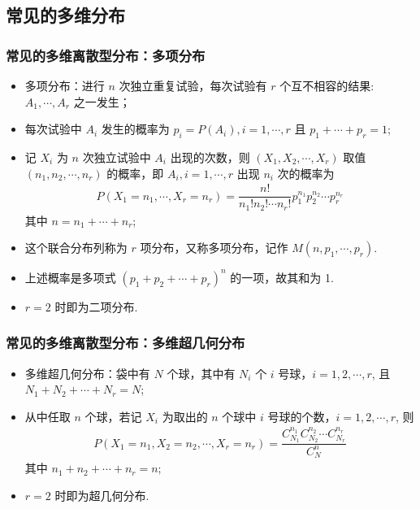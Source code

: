 \subsection{常见的多维分布}
\begin{frame}
\frametitle{常见的多维离散型分布：多项分布}
\begin{itemize}[<+-|alert@+>]
\item 多项分布：进行 $n$ 次独立重复试验，每次试验有 $r$ 个互不相容的结果:$A_1,\cdots, A_r$ 之一发生；
\item 每次试验中 $A_i$ 发生的概率为 $p_i=P (A_i), i=1,\cdots,  r$ 且 $p_1+\cdots +p_r=1$;
\item 记 $X_i$ 为 $n$ 次独立试验中 $A_i$ 出现的次数，则 $(X_1,X_2,\cdots,X_r)$ 取值 $(n_1,n_2,\cdots,n_r)$ 的概率，即 $A_i,i=1,\cdots, r$ 出现 $n_i$ 次的概率为
\pause  \begin{eqnarray*}
	P(X_1=n_1,\cdots, X_r=n_r)=\dfrac{n!}{n_1!n_2!\cdots n_r!}p_1^{n_1}p_2^{n_2}\cdots p_r^{n_r}
\end{eqnarray*}
其中 $n=n_1+\cdots+n_r$;
\item 这个联合分布列称为 $r$ 项分布，又称多项分布，记作 $M (n,p_1,\cdots,p_r)$.
\item 上述概率是多项式 $(p_1+p_2+\cdots+p_r)^n$ 的一项，故其和为 1.
\item $r=2$ 时即为二项分布.
\end{itemize}
\end{frame}
\begin{frame}
	\frametitle{常见的多维离散型分布：多维超几何分布}
	\begin{itemize}
		\item 多维超几何分布：袋中有 $N$ 个球，其中有 $N_i$ 个 $i$ 号球，$i=1,2,\cdots, r$, 且 $N_1+N_2+\cdots +N_r=N$;
		\item 从中任取 $n$ 个球，若记 $X_i$ 为取出的 $n$ 个球中 $i$ 号球的个数，$i=1,2,\cdots, r$, 则 \pause
		\begin{eqnarray*}
			P(X_1=n_1,X_2=n_2,\cdots, X_r=n_r)=\dfrac{C_{N_1}^{n_1}C_{N_2}^{n_2}\cdots C_{N_r}^{n_r}}{C_{N}^n}
		\end{eqnarray*}
		其中 $n_1+n_2+\cdots+n_r=n$;
		\item $r=2$ 时即为超几何分布.\end{itemize}
\end{frame}
